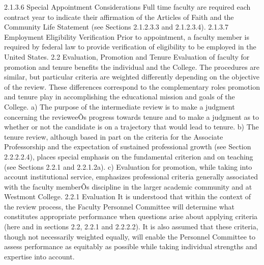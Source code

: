 \documentclass[letterpaper, 11pt]{article}
\begin{document}
2.1.3.6 Special Appointment Considerations
   Full time faculty are required each contract year to indicate their affirmation of the Articles of Faith and the Community Life Statement (see Sections 2.1.2.3.3 and 2.1.2.3.4).
2.1.3.7 Employment Eligibility Verification
   Prior to appointment, a faculty member is required by federal law to provide verification of eligibility to be employed in the United States.
2.2 Evaluation, Promotion and Tenure
   Evaluation of faculty for promotion and tenure benefits the individual and the College. The procedures are similar, but particular criteria are weighted differently depending on the objective of the review.  These differences correspond to the complementary roles promotion and tenure play in accomplishing the educational mission and goals of the College.
a) The purpose of the intermediate review is to make a judgment concerning the revieweeÕs progress towards tenure and to make a judgment as to whether or not the candidate is on a trajectory that would lead to tenure.
b) The tenure review, although based in part on the criteria for the Associate Professorship and the expectation of sustained professional growth (see Section 2.2.2.2.4), places special emphasis on the fundamental criterion and on teaching (see Sections 2.2.1 and 2.2.1.2a).
c) Evaluation for promotion, while taking into account institutional service, emphasizes professional criteria generally associated with the faculty memberÕs discipline in the larger academic community and at Westmont College.
2.2.1 Evaluation
   It is understood that within the context of the review process, the Faculty Personnel Committee will determine what constitutes appropriate performance when questions arise about applying criteria (here and in sections 2.2, 2.2.1 and 2.2.2.2).  It is also assumed that these criteria, though not necessarily weighted equally, will enable the Personnel Committee to assess performance as equitably as possible while taking individual strengths and expertise into account.
   
\end{document}
